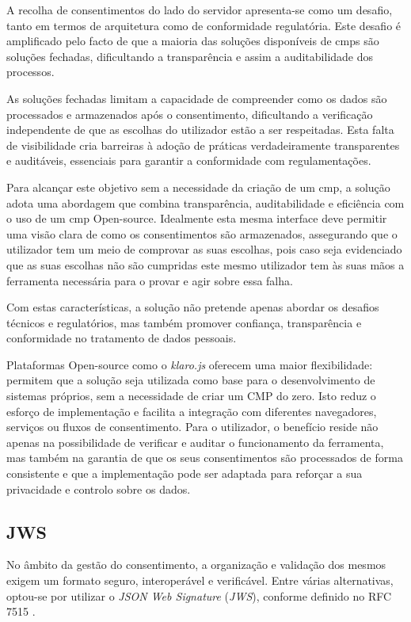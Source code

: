 A recolha de consentimentos do lado do servidor apresenta-se como um desafio, tanto em termos de arquitetura como de conformidade regulatória. Este desafio é amplificado pelo facto de que a maioria das soluções disponíveis de \acrshort{cmp}s são soluções fechadas, dificultando a transparência e assim a auditabilidade dos processos.

As soluções fechadas limitam a capacidade de compreender como os dados são processados e armazenados após o consentimento, dificultando a verificação independente de que as escolhas do utilizador estão a ser respeitadas. Esta falta de visibilidade cria barreiras à adoção de práticas verdadeiramente transparentes e auditáveis, essenciais para garantir a conformidade com regulamentações.

Para alcançar este objetivo sem a necessidade da criação de um \acrshort{cmp}, a solução adota uma abordagem que combina transparência, auditabilidade e eficiência com o uso de um \acrshort{cmp} Open-source. Idealmente esta mesma interface deve permitir uma visão clara de como os consentimentos são armazenados, assegurando que o utilizador tem um meio de comprovar as suas escolhas, pois caso seja evidenciado que as suas escolhas não são cumpridas este mesmo utilizador tem às suas mãos a ferramenta necessária para o provar e agir sobre essa falha.

Com estas características, a solução não pretende apenas abordar os desafios técnicos e regulatórios, mas também promover confiança, transparência e conformidade no tratamento de dados pessoais.

Plataformas Open-source como o \textit{klaro.js} oferecem uma maior flexibilidade: permitem que a solução seja utilizada como base para o desenvolvimento de sistemas próprios, sem a necessidade de criar um CMP do zero. Isto reduz o esforço de implementação e facilita a integração com diferentes navegadores, serviços ou fluxos de consentimento. Para o utilizador, o benefício reside não apenas na possibilidade de verificar e auditar o funcionamento da ferramenta, mas também na garantia de que os seus consentimentos são processados de forma consistente e que a implementação pode ser adaptada para reforçar a sua privacidade e controlo sobre os dados.

\subsection{JWS}

No âmbito da gestão do consentimento, a organização e validação dos mesmos exigem um formato seguro, interoperável e verificável. Entre várias alternativas, optou-se por utilizar o \textit{JSON Web Signature} (\textit{JWS}), conforme definido no RFC 7515 \citep{rfc7515}.

